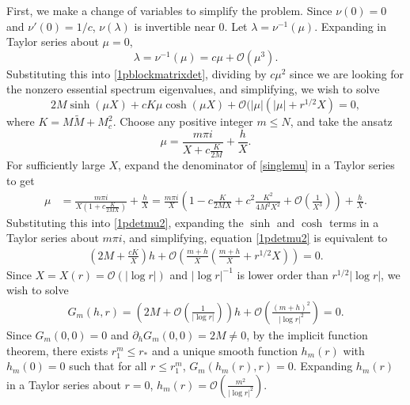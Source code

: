 \documentclass[12pt]{elsarticle}
\theoremstyle{plain}
\theoremstyle{definition}
\theoremstyle{remark}
\numberwithin{theorem}{section}
\numberwithin{equation}{section}
\begin{document}
First, we make a change of variables to simplify the problem. Since $\nu(0) = 0$ and $\nu'(0) = 1/c$, $\nu(\lambda)$ is invertible near 0. Let $\lambda = \nu^{-1}(\mu)$. Expanding in Taylor series about $\mu = 0$,
\begin{equation}\label{lambdamu}
\lambda = \nu^{-1}(\mu) = c \mu + \mathcal{O}(\mu^3).
\end{equation}
Substituting this into \cref{1pblockmatrixdet}, dividing by $c \mu^2$ since we are looking for the nonzero essential spectrum eigenvalues, and simplifying, we wish to solve
\begin{equation}\label{1pdetmu2}
2 M \sinh(\mu X) + c K \mu \cosh(\mu X) + \mathcal{O}(|\mu|(|\mu| + r^{1/2} X ) = 0,
\end{equation}
where $K = M \tilde{M} + M_c^2$. Choose any positive integer $m \leq N$, and take the ansatz
\begin{equation}\label{singlemu}
\mu = \frac{m \pi i}{X + c \frac{K}{2 M}} + \frac{h}{X}.
\end{equation}
For sufficiently large $X$, expand the denominator of \cref{singlemu} in a Taylor series to get
\begin{align}\label{singlemuTaylor}
\mu &= \frac{m \pi i}{X\left(1  + c \frac{K}{2 M X} \right) } + \frac{h}{X}
= \frac{m \pi i}{X}\left( 1 - c \frac{K}{2 M X} + c^2 \frac{K^2}{4 M^2 X^2} + \mathcal{O}\left(\frac{1}{X^3}\right) \right) + \frac{h}{X}.
\end{align}
Substituting this into \cref{1pdetmu2}, expanding the $\sinh$ and $\cosh$ terms in a Taylor series about $m \pi i$, and simplifying, equation \cref{1pdetmu2} is equivalent to 
\begin{align*}
\left( 2M + \frac{cK}{X} \right)h + \mathcal{O}\left( \frac{m+h}{X}\left(\frac{m+h}{X} + r^{1/2} X \right) \right) = 0.
\end{align*}
Since $X = X(r) = \mathcal{O}(|\log r|)$ and $|\log r|^{-1}$ is lower order than $r^{1/2} |\log r|$, we wish to solve
\begin{align*}
G_m(h, r) = \left( 2M + \mathcal{O}\left( \frac{1}{|\log r|} \right)\right) h + \mathcal{O}\left( \frac{(m+h)^2}{|\log r|^2} \right) = 0.
\end{align*}
Since $G_m(0,0) = 0$ and $\partial_h G_m(0,0) = 2M \neq 0$, by the implicit function theorem, there exists $r_1^m \leq r_*$ and a unique smooth function $h_m(r)$ with $h_m(0) = 0$ such that for all $r \leq r_1^m$, $G_m(h_m(r),r) = 0$. Expanding $h_m(r)$ in a Taylor series about $r = 0$,
$h_m(r) = \mathcal{O}\left( \frac{m^2}{|\log r|^2} \right)$.
\end{document}

